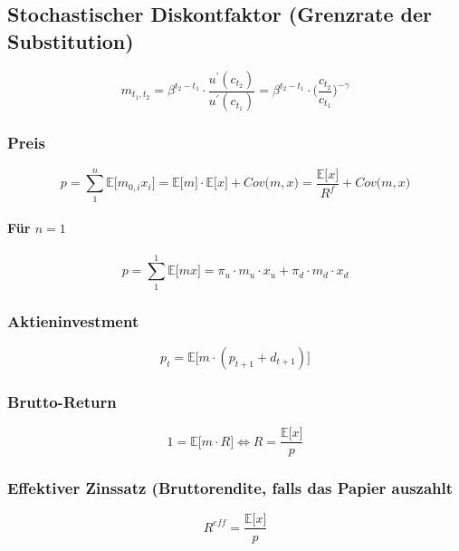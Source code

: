 \subsection{Stochastischer Diskontfaktor (Grenzrate der Substitution)}
\begin{equation}
	m_{t_1,t_2} = \beta^{t_2 - t_1} \cdot \frac{u^\prime(c_{t_2})}{u^\prime(c_{t_1})} = \beta^{t_2 - t_1} \cdot \bigg(\frac{c_{t_2}}{c_{t_1}}\bigg)^{-\gamma} \label{eq:m}
\end{equation}

\subsubsection{Preis}
\begin{equation}
	p = \sum^n_1 \mathbb{E} \big\lbrack m_{0,i} x_i \big\rbrack = \mathbb{E} \big\lbrack m \big\rbrack \cdot \mathbb{E} \big\lbrack x \big\rbrack + Cov\big(m,x\big) = \frac{\mathbb{E} \big\lbrack x \big\rbrack}{R^f} + Cov\big(m,x\big) \label{eq:p}
\end{equation}
\paragraph{Für \(n=1\)}
\begin{equation}
	p = \sum^1_1 \mathbb{E} \big\lbrack m x \big\rbrack = \pi_u \cdot m_u \cdot x_u + \pi_d \cdot m_d \cdot x_d
\end{equation}

\subsubsection{Aktieninvestment}
\begin{equation}
	p_t = \mathbb{E} \big\lbrack m \cdot (p_{t+1} + d_{t+1}) \big\rbrack \label{eq:paktie}
\end{equation}

\subsubsection{Brutto-Return}
\begin{equation}
	1 = \mathbb{E} \big\lbrack m \cdot R \big\rbrack \Leftrightarrow R = \frac{\mathbb{E} \big\lbrack x \big\rbrack}{p} \label{eq:br}
\end{equation}

\subsubsection{Effektiver Zinssatz (Bruttorendite, falls das Papier auszahlt}
\begin{equation}
	R^{eff} = \frac{\mathbb{E} \big\lbrack x \big\rbrack}{p}
\end{equation}

